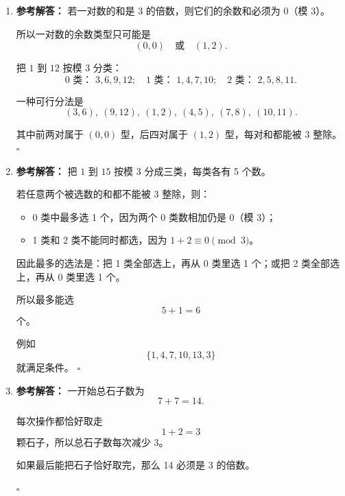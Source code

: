 \documentclass[11pt,a4paper,fontset=fandol]{ctexart}
\newenvironment{solution}{\par\noindent\textbf{参考解答：}}{\hfill$\square$\par}
\begin{document}
\begin{enumerate}
\begin{solution}
  现在取了 $8$ 个数，而余数类只有 $5$ 个。由抽屉原理，至少有两个数在同一个余数类中。

  设这两个数为 $a,b$，则
  \[
  a\equiv b\pmod 5.
  \]
  所以
  \[
  a-b\equiv 0\pmod 5.
  \]

  这说明 $a-b$ 是 $5$ 的倍数。

  因此一定有两个数的差是 $5$ 的倍数。
  \end{solution}

  \item \begin{solution}
  若一对数的和是 $3$ 的倍数，则它们的余数和必须为 $0$（模 $3$）。

  所以一对数的余数类型只可能是
  \[
  (0,0)\quad \text{或} \quad (1,2).
  \]

  把 $1$ 到 $12$ 按模 $3$ 分类：
  \[
  0\text{ 类： }3,6,9,12;
  \quad
  1\text{ 类： }1,4,7,10;
  \quad
  2\text{ 类： }2,5,8,11.
  \]

  一种可行分法是
  \[
  (3,6),\ (9,12),\ (1,2),\ (4,5),\ (7,8),\ (10,11).
  \]

  其中前两对属于 $(0,0)$ 型，后四对属于 $(1,2)$ 型，每对和都能被 $3$ 整除。
  \end{solution}

  \item \begin{solution}
  把 $1$ 到 $15$ 按模 $3$ 分成三类，每类各有 5 个数。

  若任意两个被选数的和都不能被 $3$ 整除，则：
  \begin{itemize}
    \item 0 类中最多选 1 个，因为两个 0 类数相加仍是 $0$（模 $3$）；
    \item 1 类和 2 类不能同时都选，因为 $1+2\equiv 0\pmod 3$。
  \end{itemize}

  因此最多的选法是：把 1 类全部选上，再从 0 类里选 1 个；或把 2 类全部选上，再从 0 类里选 1 个。

  所以最多能选
  \[
  5+1=6
  \]
  个。

  例如
  \[
  \{1,4,7,10,13,3\}
  \]
  就满足条件。
  \end{solution}

  \item \begin{solution}
  一开始总石子数为
  \[
  7+7=14.
  \]

  每次操作都恰好取走
  \[
  1+2=3
  \]
  颗石子，所以总石子数每次减少 3。

  如果最后能把石子恰好取完，那么 14 必须是 3 的倍数。


\end{solution}
\end{enumerate}
\end{document}
